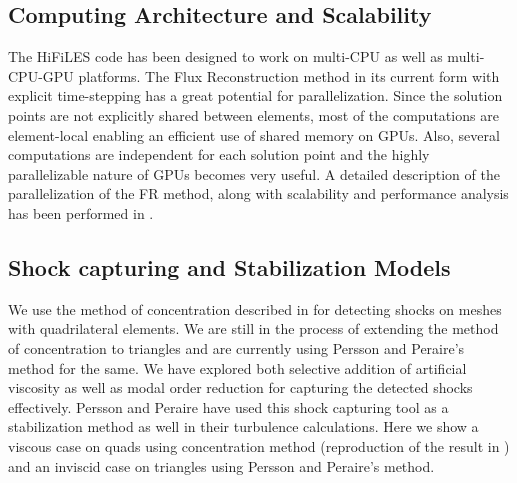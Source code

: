 \subsection{Computing Architecture and Scalability}

The HiFiLES code has been designed to work on multi-CPU as well as multi-CPU-GPU platforms. The Flux Reconstruction method in its current form with explicit time-stepping has a great potential for parallelization. Since the solution points are not explicitly shared between elements, most of the computations are element-local enabling an efficient use of shared memory on GPUs. Also, several computations are independent for each solution point and the highly parallelizable nature of GPUs becomes very useful. A detailed description of the parallelization of the FR method, along with scalability and performance analysis has been performed in \cite{castonguay2011}.

\subsection{Shock capturing and Stabilization Models}

We use the method of concentration described in \cite{abhishekshockcapture} for detecting shocks on meshes with quadrilateral elements. We are still in the process of extending the method of concentration to triangles and are currently using Persson and Peraire's method \cite{Persson06} \cite{Persson13} for the same. We have explored both selective addition of artificial viscosity as well as modal order reduction for capturing the detected shocks effectively. Persson and Peraire have used this shock capturing tool as a stabilization method as well in their turbulence calculations. Here we show a viscous case on quads using concentration method (reproduction of the result in \cite{abhishekshockcapture}) and an inviscid case on triangles using Persson and Peraire's method.

